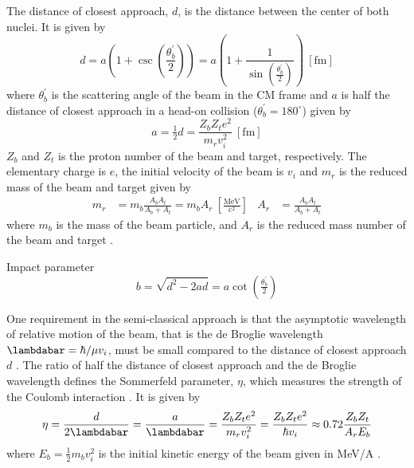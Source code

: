 \documentclass[twoside,english]{uiofysmaster/uiofysmaster}
\begin{document}
The distance of closest approach, $d$, is the distance between the center of both nuclei. 
It is given by
\begin{equation}
	d = a \left( 1 + \csc \left( \frac{\theta_b^{'}}{2} \right) \right) = a \left( 1 + \frac{1}{\sin \left( \frac{\theta_b^{'}}{2} \right)} \right) ~[\text{fm}]
\end{equation}
where $\theta_b^{'}$ is the scattering angle of the beam in the CM frame and $a$ is half the distance of closest approach in a head-on collision ($\theta_b^{'} = 180^\circ$) given by
\begin{equation}
	 a = \tfrac{1}{2} d = \frac{Z_b Z_t e^2}{m_r v_i^2} ~[\text{fm}]
\end{equation}
$Z_b$ and $Z_t$ is the proton number of the beam and target, respectively. 
The elementary charge is $e$, the initial velocity of the beam is $v_i$ and $m_r$ is the reduced mass of the beam and target given by
\begin{align}
	 m_r &= m_b \frac{A_b A_t}{A_b + A_t} = m_b A_r  ~\left[ \tfrac{\text{MeV}}{\text{c}^2} \right]
	 &
	 A_r &= \frac{A_b A_t}{A_b + A_t}
\end{align}
where $m_b$ is the mass of the beam particle, and $A_r$ is the reduced mass number of the beam and target \cite{RBass, EE-Coulex}. 




Impact parameter
\begin{equation}
	b = \sqrt{d^2 - 2ad} = a \cot \left( \tfrac{\theta_b^{'}}{2} \right)
\end{equation}




One requirement in the semi-classical approach is that the asymptotic wavelength of relative motion of the beam, that is the de Broglie wavelength $\lambdabar = \hbar/\mu v_i$, must be small compared to the distance of closest approach $d$ \cite{RBass, EE-Coulex}.
The ratio of half the distance of closest approach and the de Broglie wavelength defines the Sommerfeld parameter, $\eta$, which measures the strength of the Coulomb interaction \cite{Cline1969}.
It is given by
\begin{equation}
	\eta = \frac{d}{2\lambdabar} = \frac{a}{\lambdabar} = \frac{Z_b Z_t e^2}{m_r v_i^2} = \frac{Z_b Z_t e^2}{\hbar v_i} \approx 0.72 \frac{Z_b Z_t}{A_r E_b}
\end{equation}
where $E_b = \tfrac{1}{2} m_b v_i^2$ is the initial kinetic energy of the beam given in MeV/A \cite{RBass}.
\end{document}
